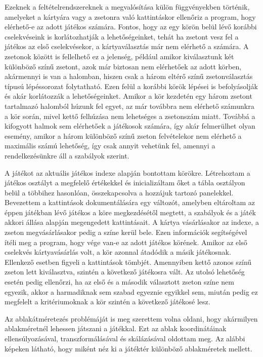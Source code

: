 Ezeknek a feltételrendszereknek a megvalósítása külön függvényekben történik, amelyeket a kártyára vagy a zsetonra való kattintáskor ellenőriz a program, hogy elérhető-e az adott játékos számára. Fontos, hogy az egy körön belül lévő korábbi cselekvéseink is korlátozhatják a lehetőségeinket, tehát ha zsetont vesz fel a játékos az első cselekvésekor, a kártyaválasztás már nem elérhető a számára. A zsetonok között is fellelhető ez a jelenség, például amikor kiválasztunk két különböző színű zsetont, azok már biztosan nem elérhetőek az adott körben, akármennyi is van a halomban, hiszen csak a három eltérő színű zsetonválasztás típusú lépéssorozat folytatható. Ezen felül a korábbi körök lépései is befolyásolják és akár korlátozzák a lehetőségeinket. Amikor a kör kezdetén egy három zsetont tartalmazó halomból húzunk fel egyet, az már továbbra nem elérhető számunkra a kör során, mivel kettő felhúzása nem lehetséges a zsetonszám miatt. Továbbá a kifogyott halmok sem elérhetőek a játékosok számára, így akár felmerülhet olyan esemény, amikor a három különböző színű zseton felvételekor nem elérhető a maximális számú lehetőség, így csak annyit vehetünk fel, amennyi a rendelkezésünkre áll a szabályok szerint.


A játékot az aktuális játékos indexe alapján bontottam körökre. Létrehoztam a játékos osztályt a megfelelő értékekkel és inicializáltam őket a tábla osztályon belül a többihez hasonlóan, összekapcsolva a hozzájuk tartozó panelekkel. Bevezettem a kattintások dokumentálására egy változót, amelyben eltároltam az éppen játékban lévő játékos a köre megkezdésétől megtett, a szabályok és a játék akkori állása alapján megengedett kattintásait. A kártya vásárlásakor az indexe, a zseton megvásárlásakor pedig a színe kerül bele. Ezen információk segítségével ítéli meg a program, hogy vége van-e az adott játékos körének. Amikor az első cselekvés kártyavásárlás volt, a kör azonnal átadódik a másik játékosnak. Ellenkező esetben figyeli a kattintások tömbjét. Amennyiben kettő azonos színű zseton lett kiválasztva, szintén a következő játékosra vált. Az utolsó lehetőség esetén pedig ellenőrzi, ha az első és a második választott zseton színe nem egyezik, akkor a harmadiknak sem szabad egyeznie egyikkel sem, miután pedig ez megfelelt a kritériumoknak a kör szintén a következő játékosé lesz.


Az ablakátméretezés problémáját is meg szerettem volna oldani, hogy akármilyen ablakméretnél lehessen játszani a játékkal. Ezt az ablak koordinátáinak ellensúlyozásával, transzformálásával és skálázásával oldottam meg. Az alábbi képeken látható, hogy miként néz ki a játéktér különböző ablakméretek mellett.


